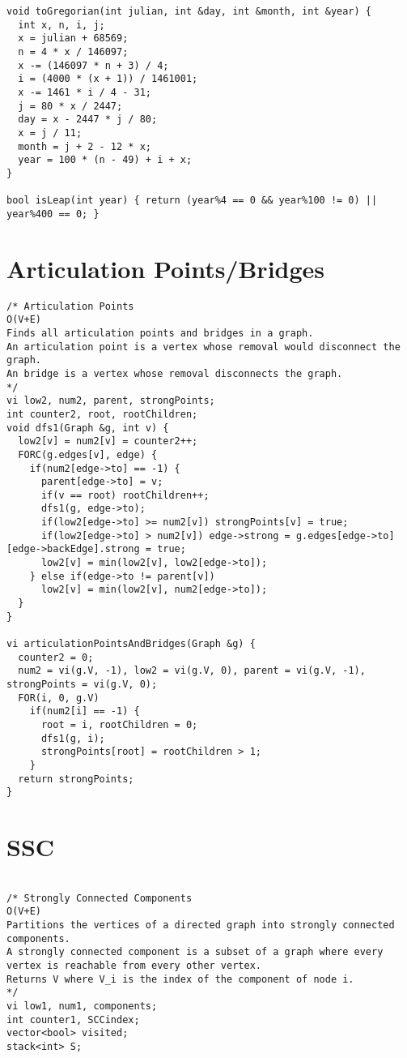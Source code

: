 \documentclass[8pt, oneside]{extarticle}
\begin{document}
\begin{multicols}{3}
\begin{lstlisting}
void toGregorian(int julian, int &day, int &month, int &year) {
  int x, n, i, j;
  x = julian + 68569;
  n = 4 * x / 146097;
  x -= (146097 * n + 3) / 4;
  i = (4000 * (x + 1)) / 1461001;
  x -= 1461 * i / 4 - 31;
  j = 80 * x / 2447;
  day = x - 2447 * j / 80;
  x = j / 11;
  month = j + 2 - 12 * x;
  year = 100 * (n - 49) + i + x;
}

bool isLeap(int year) { return (year%4 == 0 && year%100 != 0) || year%400 == 0; }
\end{lstlisting}

\section{Articulation Points/Bridges}
\begin{lstlisting}
/* Articulation Points
O(V+E)
Finds all articulation points and bridges in a graph.
An articulation point is a vertex whose removal would disconnect the graph.
An bridge is a vertex whose removal disconnects the graph.
*/
vi low2, num2, parent, strongPoints;
int counter2, root, rootChildren;
void dfs1(Graph &g, int v) {
  low2[v] = num2[v] = counter2++;
  FORC(g.edges[v], edge) {
    if(num2[edge->to] == -1) {
      parent[edge->to] = v;
      if(v == root) rootChildren++;
      dfs1(g, edge->to);
      if(low2[edge->to] >= num2[v]) strongPoints[v] = true;
      if(low2[edge->to] > num2[v]) edge->strong = g.edges[edge->to][edge->backEdge].strong = true;
      low2[v] = min(low2[v], low2[edge->to]);
    } else if(edge->to != parent[v])
      low2[v] = min(low2[v], num2[edge->to]);
  }
}

vi articulationPointsAndBridges(Graph &g) {
  counter2 = 0;
  num2 = vi(g.V, -1), low2 = vi(g.V, 0), parent = vi(g.V, -1), strongPoints = vi(g.V, 0);
  FOR(i, 0, g.V)
    if(num2[i] == -1) {
      root = i, rootChildren = 0;
      dfs1(g, i);
      strongPoints[root] = rootChildren > 1;
    }
  return strongPoints;
}
\end{lstlisting}

\section{SSC}

\begin{lstlisting}

/* Strongly Connected Components
O(V+E)
Partitions the vertices of a directed graph into strongly connected components.
A strongly connected component is a subset of a graph where every vertex is reachable from every other vertex.
Returns V where V_i is the index of the component of node i.
*/
vi low1, num1, components;
int counter1, SCCindex;
vector<bool> visited;
stack<int> S;


\end{lstlisting}
\end{multicols}
\end{document}
